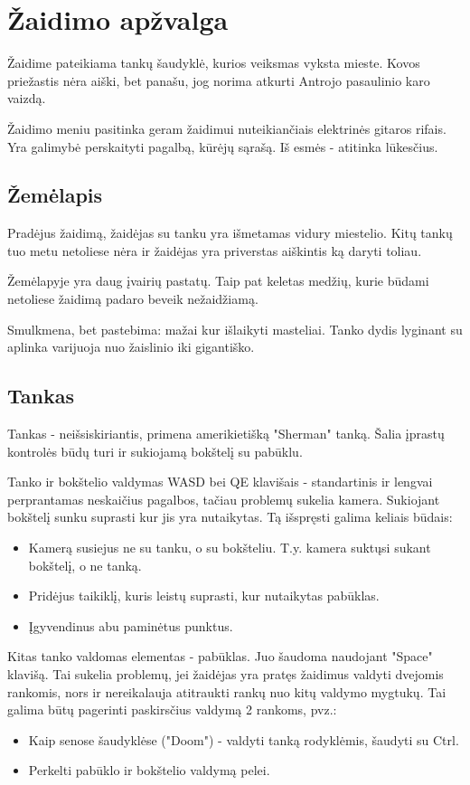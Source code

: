 \section{Žaidimo apžvalga}

Žaidime pateikiama tankų šaudyklė, kurios veiksmas vyksta mieste.
Kovos priežastis nėra aiški, bet panašu, jog norima atkurti Antrojo pasaulinio karo vaizdą.

Žaidimo meniu pasitinka geram žaidimui nuteikiančiais elektrinės gitaros rifais. 
Yra galimybė perskaityti pagalbą, kūrėjų sąrašą. Iš esmės - atitinka lūkesčius.

\subsection{Žemėlapis}

Pradėjus žaidimą, žaidėjas su tanku yra išmetamas vidury miestelio.
Kitų tankų tuo metu netoliese nėra ir žaidėjas yra priverstas aiškintis ką daryti toliau.

Žemėlapyje yra daug įvairių pastatų. 
Taip pat keletas medžių, kurie būdami netoliese žaidimą padaro beveik nežaidžiamą.

Smulkmena, bet pastebima: mažai kur išlaikyti masteliai.
Tanko dydis lyginant su aplinka varijuoja nuo žaislinio iki gigantiško.

\subsection{Tankas}


Tankas - neišsiskiriantis, primena amerikietišką "Sherman" tanką.
Šalia įprastų kontrolės būdų turi ir sukiojamą bokštelį su pabūklu.

Tanko ir bokštelio valdymas WASD bei QE klavišais - standartinis ir lengvai perprantamas neskaičius pagalbos, tačiau problemų sukelia kamera.
Sukiojant bokštelį sunku suprasti kur jis yra nutaikytas. 
Tą išspręsti galima keliais būdais:
	\begin{itemize}
		\item Kamerą susiejus ne su tanku, o su bokšteliu. T.y. kamera suktųsi sukant bokštelį, o ne tanką.
		\item Pridėjus taikiklį, kuris leistų suprasti, kur nutaikytas pabūklas.
		\item Įgyvendinus abu paminėtus punktus.
	\end{itemize}

Kitas tanko valdomas elementas - pabūklas. 
Juo šaudoma naudojant "Space" klavišą.
Tai sukelia problemų, jei žaidėjas yra pratęs žaidimus valdyti dvejomis rankomis, 
nors ir nereikalauja atitraukti rankų nuo kitų valdymo mygtukų.
Tai galima būtų pagerinti paskirsčius valdymą 2 rankoms, pvz.:
	\begin{itemize}
		\item Kaip senose šaudyklėse ("Doom") - valdyti tanką rodyklėmis, šaudyti su Ctrl.
		\item Perkelti pabūklo ir bokštelio valdymą pelei.
	\end{itemize}
	
